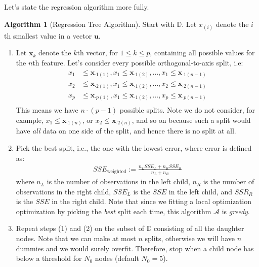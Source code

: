 \documentclass[12pt, a4paper]{article}
\theoremstyle{definition}
\newtheorem*{algorithm}{Algorithm}
\begin{document}
	Let's state the regression algorithm more fully.
	\begin{tcolorbox}[breakable]
		\begin{algorithm}[Regression Tree Algorithm]
			Start with $\mathbb{D}$. Let $x_{(i)}$ denote the $i$th smallest
			value in a vector $\bm{u}$.
			\begin{enumerate}[label=(\arabic*)]
				\item Let $\bm{x}_k$ denote the $k$th vector, for $1\leq k\leq p$,
				containing all possible values for the $n$th feature.
				Let's consider every possible orthogonal-to-axis split, i.e:
				\begin{align*}
					x_1&\leq \bm{x}_{\cdot 1(1)}, x_1 \leq \bm{x}_{\cdot 1(2)}, \ldots, x_1 \leq \bm{x}_{\cdot 1(n-1)}\\
					x_2&\leq \bm{x}_{\cdot 2(1)}, x_1 \leq \bm{x}_{\cdot 1(2)}, \ldots, x_2 \leq \bm{x}_{\cdot 2(n-1)}\\
					x_p&\leq \bm{x}_{\cdot p(1)}, x_1 \leq \bm{x}_{\cdot 1(2)}, \ldots, x_p \leq \bm{x}_{\cdot p(n-1)}\\
				\end{align*}
				This means we have $n\cdot (p-1)$ possible splits. Note we do not
				consider, for example, $x_1\leq \bm{x}_{\cdot 1(n)}$,
				or $x_2\leq \bm{x}_{\cdot 2(n)}$, and so on because such a split
				would have \textit{all} data on one side of the split, and hence
				there is no split at all.
				\item Pick the best split, i.e., the one with the lowest error,
				where error is defined as:
				\begin{align*}
					SSE_{\text{weighted}} := \frac{n_L SSE_L + n_R SSE_R}{n_L + n_R}
				\end{align*}
				where $n_L$ is the number of observations in the left child,
				$n_R$ is the number of observations in the right child, $SSE_L$
				is the $SSE$ in the left child, and $SSR_R$ is the $SSE$ in
				the right child. Note that since we fitting a local optimization
				optimization by picking the \textit{best} split each time, this
				algorithm $\mathcal{A}$ is \textit{greedy}.
				\item Repeat steps (1) and (2) on the subset of $\mathbb{D}$
				consisting of all the daughter nodes. Note that we can make
				at most $n$ splits, otherwise we will have $n$ dummies and we
				would surely overfit. Therefore, stop when a child node
				has below a threshold for $N_0$ nodes (default $N_0 = 5$).
			\end{enumerate}
		\end{algorithm}
	\end{tcolorbox}
\end{document}
